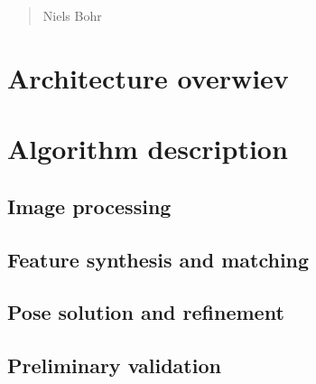 \begin{quotation}
{\footnotesize
{}
\begin{flushright}
Niels Bohr
\end{flushright}
}
\end{quotation}
\vspace{0.5cm}

\section{Architecture overwiev}

\section{Algorithm description}

\subsection{Image processing}

\subsection{Feature synthesis and matching}

\subsection{Pose solution and refinement}

\subsection{Preliminary validation}
